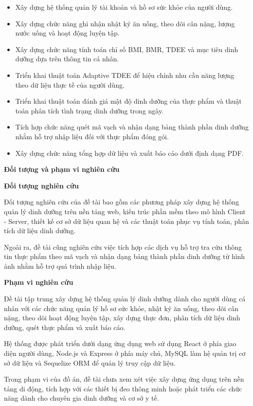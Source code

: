 \begin{itemize}
\item Xây dựng hệ thống quản lý tài khoản và hồ sơ sức khỏe của người dùng.
\item Xây dựng chức năng ghi nhận nhật ký ăn uống, theo dõi cân nặng, lượng nước uống và hoạt động luyện tập.
\item Xây dựng chức năng tính toán chỉ số BMI, BMR, TDEE và mục tiêu dinh dưỡng dựa trên thông tin cá nhân.
\item Triển khai thuật toán Adaptive TDEE để hiệu chỉnh nhu cầu năng lượng theo dữ liệu thực tế của người dùng.
\item Triển khai thuật toán đánh giá mật độ dinh dưỡng của thực phẩm và thuật toán phân tích tình trạng dinh dưỡng trong ngày.
\item Tích hợp chức năng quét mã vạch và nhận dạng bảng thành phần dinh dưỡng nhằm hỗ trợ nhập liệu đối với thực phẩm đóng gói.
\item Xây dựng chức năng tổng hợp dữ liệu và xuất báo cáo dưới định dạng PDF.
\end{itemize}
\textbf{Đối tượng và phạm vi nghiên cứu}

\textbf{Đối tượng nghiên cứu}

Đối tượng nghiên cứu của đề tài bao gồm các phương pháp xây dựng hệ thống quản lý dinh dưỡng trên nền tảng web, kiến trúc phần mềm theo mô hình Client - Server, thiết kế cơ sở dữ liệu quan hệ và các thuật toán phục vụ tính toán, phân tích dữ liệu dinh dưỡng.

Ngoài ra, đề tài cũng nghiên cứu việc tích hợp các dịch vụ hỗ trợ tra cứu thông tin thực phẩm theo mã vạch và nhận dạng bảng thành phần dinh dưỡng từ hình ảnh nhằm hỗ trợ quá trình nhập liệu.

\textbf{Phạm vi nghiên cứu}

Đề tài tập trung xây dựng hệ thống quản lý dinh dưỡng dành cho người dùng cá nhân với các chức năng quản lý hồ sơ sức khỏe, nhật ký ăn uống, theo dõi cân nặng, theo dõi hoạt động luyện tập, xây dựng thực đơn, phân tích dữ liệu dinh dưỡng, quét thực phẩm và xuất báo cáo.

Hệ thống được phát triển dưới dạng ứng dụng web sử dụng React ở phía giao diện người dùng, Node.js và Express ở phía máy chủ, MySQL làm hệ quản trị cơ sở dữ liệu và Sequelize ORM để quản lý truy cập dữ liệu.

Trong phạm vi của đồ án, đề tài chưa xem xét việc xây dựng ứng dụng trên nền tảng di động, tích hợp với các thiết bị đeo thông minh hoặc phát triển các chức năng dành cho chuyên gia dinh dưỡng và cơ sở y tế.

